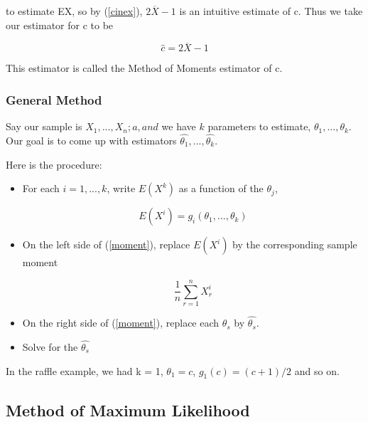 to estimate EX, so by (\ref{cinex}), $2 \overline{X} - 1$ is an
intuitive estimate of c.  Thus we take our estimator for c to be

\begin{equation}
\label{cinexhat}
\widehat{c} = 2 \overline{X} - 1
\end{equation}

This estimator is called the Method of Moments estimator of c.


\subsubsection{General Method}

Say our sample is $X_1,...,X_n;a, and$ we have $k$ parameters to
estimate, $\theta_1,...,\theta_k$.  Our goal is to come up with
estimators $\widehat{\theta_1},...,\widehat{\theta_k}$.  

Here is the procedure:

\begin{itemize}

\item For each $i = 1,...,k$, write $E(X^k)$ as a function of the
$\theta_j$,

\begin{equation}
\label{moment}
E(X^i) = g_i(\theta_1,...,\theta_k)
\end{equation}

\item On the left side of (\ref{moment}), replace $E(X^i)$ by the
corresponding sample moment

\begin{equation}
\label{sammoment}
\frac{1}{n} \sum_{r=1}^n X_r^i
\end{equation}

\item On the right side of (\ref{moment}), replace each $\theta_s$ by
$\widehat{\theta_s}$.

\item Solve for the $\widehat{\theta_s}$

\end{itemize}

In the raffle example, we had k = 1, $\theta_1 = c$,
$g_1(c) = (c+1)/2$ and so on.  

\subsection{Method of Maximum Likelihood}
\label{mle}

